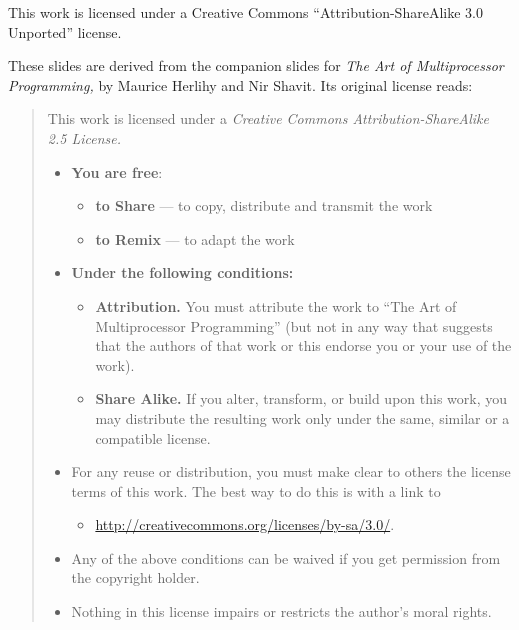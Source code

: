 \documentclass{beamer}
\begin{document}
\begin{frame}{}{}
\vskip4pt
\parskip=4pt
\scriptsize
This work is licensed under a Creative Commons “Attribution-ShareAlike
3.0 Unported” license.
\par
These slides are derived from the companion slides for \emph{The Art of
Multiprocessor Programming,} by Maurice Herlihy and Nir Shavit. Its
original license reads:
\begin{quote}
  This work is licensed under a \emph{Creative Commons Attribution-ShareAlike
  2.5 License.}
\begin{itemize}
  \item \textbf{You are free}:
    \begin{itemize}
      \item\tiny \textbf{to Share} — to copy, distribute and transmit the work
        \item\tiny \textbf{to Remix} — to adapt the work
    \end{itemize}
  \item \textbf{Under the following conditions:}
    \begin{itemize}
      \item\tiny \textbf{Attribution.} You must attribute the work to “The Art of
        Multiprocessor Programming” (but not in any way that suggests
        that the authors of that work or this endorse you or your use of
        the work).
      \item\tiny \textbf{Share Alike.} If you alter, transform, or build upon this work,
        you may distribute the resulting work only under the same,
        similar or a compatible license.
    \end{itemize}
  \item For any reuse or distribution, you must make clear to others the
    license terms of this work. The best way to do this is with a link to
    \begin{itemize}
      \item\tiny \url{http://creativecommons.org/licenses/by-sa/3.0/}.
    \end{itemize}
  \item Any of the above conditions can be waived if you get permission from
    the copyright holder.
  \item Nothing in this license impairs or restricts the author’s moral
    rights.
\end{itemize}
\end{quote}
\end{frame}
\end{document}
